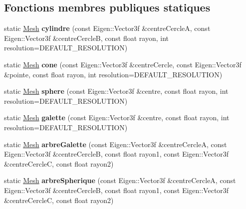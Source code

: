 \subsection*{Fonctions membres publiques statiques}
\begin{DoxyCompactItemize}
\item 
\hypertarget{class_mesh_a161e2b2eb141f0bd51d586a85faa004b}{}static \hyperlink{class_mesh}{Mesh} {\bfseries cylindre} (const Eigen\+::\+Vector3f \&centre\+Cercle\+A, const Eigen\+::\+Vector3f \&centre\+Cercle\+B, const float rayon, int resolution=D\+E\+F\+A\+U\+L\+T\+\_\+\+R\+E\+S\+O\+L\+U\+T\+I\+O\+N)\label{class_mesh_a161e2b2eb141f0bd51d586a85faa004b}

\item 
\hypertarget{class_mesh_a51c1471abac6ed9afd5dd9299a45815e}{}static \hyperlink{class_mesh}{Mesh} {\bfseries cone} (const Eigen\+::\+Vector3f \&centre\+Cercle, const Eigen\+::\+Vector3f \&pointe, const float rayon, int resolution=D\+E\+F\+A\+U\+L\+T\+\_\+\+R\+E\+S\+O\+L\+U\+T\+I\+O\+N)\label{class_mesh_a51c1471abac6ed9afd5dd9299a45815e}

\item 
\hypertarget{class_mesh_a5838a1b71351b4e2e54b20fe105a3da2}{}static \hyperlink{class_mesh}{Mesh} {\bfseries sphere} (const Eigen\+::\+Vector3f \&centre, const float rayon, int resolution=D\+E\+F\+A\+U\+L\+T\+\_\+\+R\+E\+S\+O\+L\+U\+T\+I\+O\+N)\label{class_mesh_a5838a1b71351b4e2e54b20fe105a3da2}

\item 
\hypertarget{class_mesh_a8c76f28752255113eeef0df2866168dd}{}static \hyperlink{class_mesh}{Mesh} {\bfseries galette} (const Eigen\+::\+Vector3f \&centre, const float rayon, int resolution=D\+E\+F\+A\+U\+L\+T\+\_\+\+R\+E\+S\+O\+L\+U\+T\+I\+O\+N)\label{class_mesh_a8c76f28752255113eeef0df2866168dd}

\item 
\hypertarget{class_mesh_ae3ecd907f70111019bb9ef4a00a5fdfa}{}static \hyperlink{class_mesh}{Mesh} {\bfseries arbre\+Galette} (const Eigen\+::\+Vector3f \&centre\+Cercle\+A, const Eigen\+::\+Vector3f \&centre\+Cercle\+B, const float rayon1, const Eigen\+::\+Vector3f \&centre\+Cercle\+C, const float rayon2)\label{class_mesh_ae3ecd907f70111019bb9ef4a00a5fdfa}

\item 
\hypertarget{class_mesh_a8e987e2f3cc971b984d7ca52e7a92b06}{}static \hyperlink{class_mesh}{Mesh} {\bfseries arbre\+Spherique} (const Eigen\+::\+Vector3f \&centre\+Cercle\+A, const Eigen\+::\+Vector3f \&centre\+Cercle\+B, const float rayon1, const Eigen\+::\+Vector3f \&centre\+Cercle\+C, const float rayon2)\label{class_mesh_a8e987e2f3cc971b984d7ca52e7a92b06}


\end{DoxyCompactItemize}
